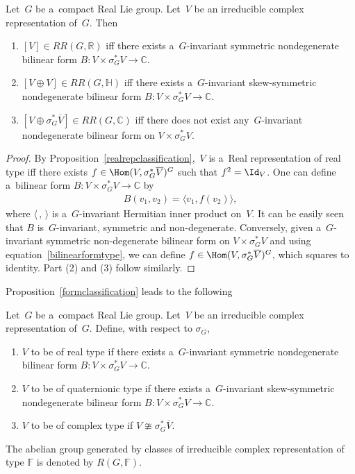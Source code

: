 \begin{Proposition}
\label{formclassification}
Let~$G$ be a~compact Real Lie group.
Let~$V$ be an irreducible complex representation of~$G$.
Then
\begin{enumerate}\itemsep=0pt
\item[$1.$]
$[V]\in RR(G, \mathbb{R})$ iff there exists a~$G$-invariant symmetric nondegenerate bilinear form $B: V\times
\sigma_G^*V\to\mathbb{C}$.
\item[$2.$]
$[V\oplus V]\in RR(G, \mathbb{H})$ iff there exists a~$G$-invariant skew-symmetric nondegenerate bilinear form $B:
V\times
\sigma_G^*V\to\mathbb{C}$.
\item[$3.$]
$[V\oplus
\sigma_G^*\overline{V}
]\in RR(G, \mathbb{C})$ iff there does not exist any~$G$-invariant nondegenerate bilinear form on $V\times
\sigma_G^*V$.
\end{enumerate}
\end{Proposition}
\begin{proof}
By Proposition~\ref{realrepclassification},~$V$ is a~Real representation of real type if\/f there exists
$f\in\Hom(V,
\sigma_G^*\overline{V})^G$ such that $f^2=\Id_V$.
One can def\/ine a~bilinear form $B: V\times
\sigma_G^*V\to\mathbb{C}$ by
\begin{gather}
\label{bilinearformtype}
B(v_1, v_2)=\langle v_1, f(v_2)\rangle,
\end{gather}
where $\langle \,, \,\rangle$ is a~$G$-invariant Hermitian inner product on~$V$.
It can be easily seen that $B$ is~$G$-invariant, symmetric and non-degenerate.
Conversely, given a~$G$-invariant symmetric non-degenerate bilinear form on $V\times
\sigma_G^*V$ and using equation~\eqref{bilinearformtype}, we can def\/ine $f\in\Hom(V,
\sigma_G^*\overline{V})^G$, which squares to identity.
Part (2) and (3) follow similarly.
\end{proof}
Proposition~\ref{formclassification} leads to the following

\begin{Definition}
\label{cplxrepclassification}
Let~$G$ be a~compact Real Lie group.
Let~$V$ be an irreducible complex representation of~$G$.
Def\/ine, with respect to $\sigma_G$,
\begin{enumerate}\itemsep=0pt
\item
$V$ to be of real type if there exists a~$G$-invariant symmetric nondegenerate bilinear form $B: V\times
\sigma_G^*V\to\mathbb{C}$.
\item
$V$ to be of quaternionic type if there exists a~$G$-invariant skew-symmetric nondegenerate bilinear form $B: V\times
\sigma_G^*V\to\mathbb{C}$.
\item
$V$ to be of complex type if $V\ncong
\sigma_G^*\overline{V}$.
\end{enumerate}
The abelian group generated by classes of irreducible complex representation of type $\mathbb{F}$ is denoted by $R(G,
\mathbb{F})$.
\end{Definition}

